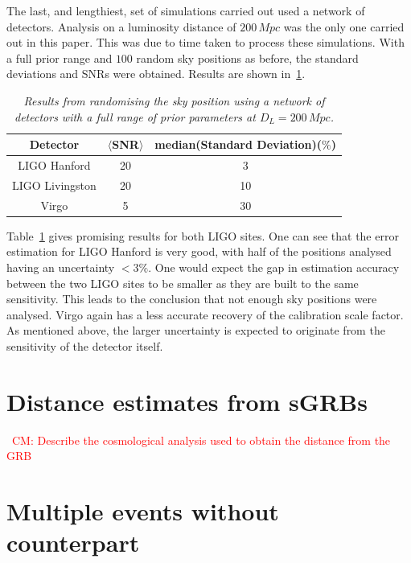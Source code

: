 \documentclass[12pt]{iopart}
\newcommand{\cm}[1]{\textcolor{red}{CM: #1}}
\begin{document}
The last, and lengthiest, set of simulations carried out used a network of
detectors. Analysis on a luminosity distance of $200 \,Mpc$ was the only one
carried out in this paper. This was due to time taken to process these
simulations. With a full prior range and $100$ random sky positions as before,
the standard deviations and SNRs were obtained. Results are shown
in~\ref{tab:mult-rndsp}.


\begin{table}
\centering
\begin{tabular}[H]{|c|c|c|}
\hline
  Detector   & $\langle$SNR$\rangle$ & median(Standard Deviation)($\%$)\\
\hline
LIGO Hanford & 20& 3 \\
LIGO Livingston & 20 & 10 \\
Virgo & 5 & 30\\
\hline
\end{tabular}
\caption{\textit{Results from randomising the sky position using a network of
detectors with a full range of prior parameters at $D_{L} = 200\, Mpc$.}}
\label{tab:mult-rndsp}
\end{table}


Table~\ref{tab:mult-rndsp} gives promising results for both LIGO sites. One can
see that the error estimation for LIGO Hanford is very good, with half of the
positions analysed having an uncertainty $<3\%$. One would expect the gap in
estimation accuracy between the two LIGO sites to be smaller as they are built
to the same sensitivity. This leads to the conclusion that not enough sky
positions were analysed. Virgo again has a less accurate recovery of the
calibration scale factor. As mentioned above, the larger uncertainty is
expected to originate from the sensitivity of the detector itself.

\section{Distance estimates from \acp{sGRB}\label{sec:cosmo}}

~\cm{Describe the cosmological analysis used to obtain the distance from the
GRB}

\section{Multiple events without counterpart\label{sec:multiple}}
\end{document}
